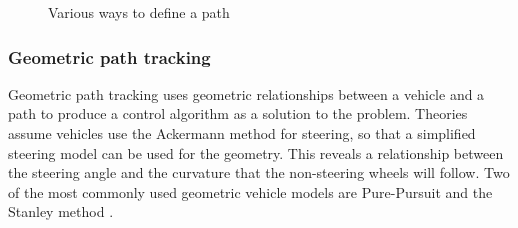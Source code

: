 \documentclass[main.tex]{subfiles}
\begin{document}
\begin{figure}[htbp]
\centering
{}\hspace{1em}%
\hspace{1em}%
\caption{Various ways to define a path \parencite{Giesbrecht2005}}
\end{figure}

\subsubsection{Geometric path tracking}
Geometric path tracking uses geometric relationships between a vehicle and a path to produce a control algorithm as a solution to the problem. Theories assume vehicles use the Ackermann method for steering, so that a simplified steering model can be used for the geometry. This reveals a relationship between the steering angle and the curvature that the non-steering wheels will follow. Two of the most commonly used geometric vehicle models are Pure-Pursuit and the Stanley method \parencite{snider2009}.
\end{document}
